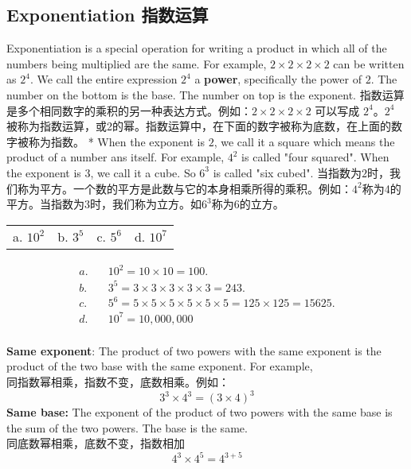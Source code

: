 \subsection{Exponentiation 指数运算}
\begin{paracol}{2}
Exponentiation is a special operation for writing a product in which all of the numbers being multiplied are the same. For example, $2\times 2\times 2\times 2$ can be written as $2^4$. We call the entire expression $2^4$ a {\bf power}, specifically the power of $2$. The number on the bottom is the base. The number on top is the exponent. 
\switchcolumn[1]
指数运算是多个相同数字的乘积的另一种表达方式。例如：$2\times 2\times 2\times 2$ 可以写成 $2^4$。$2^4$ 被称为指数运算，或2的幂。指数运算中，在下面的数字被称为底数，在上面的数字被称为指数。
\switchcolumn[0]*
When the exponent is $2$, we call it a square which means the product of a number ans itself. For example, $4^2$ is called "four squared". When the exponent is $3$, we call it a cube. So $6^3$ is called "six cubed".
\switchcolumn[1]
当指数为$2$时，我们称为平方。一个数的平方是此数与它的本身相乘所得的乘积。例如：$4^2$称为4的平方。当指数为$3$时，我们称为立方。如$6^3$称为6的立方。
\end{paracol}

\begin{example}
\begin{tabular}{cccc}
a. $10^2$& b. $3^5$ & c. $5^6$ & d. $10^7$
\end{tabular}
\end{example}
\begin{solution}
\begin{align*}
a.\quad & 10^2 = 10\times 10 = 100.\\
b.\quad & 3^5 = 3\times 3\times 3\times 3\times 3 = 243.\\
c.\quad & 5^6 = 5\times 5\times 5\times 5\times 5\times 5 = 125\times 125 = 15625.\\
d.\quad & 10^7 = 10,000,000\\
\end{align*}
\end{solution}

\begin{newprop}
{\bf Same exponent}: The product of two powers with the same exponent is the product of the two base with the same exponent. For example, \\
同指数幂相乘，指数不变，底数相乘。例如：
$$
3^3\times 4^3 = (3\times 4)^3
$$
{\bf Same base:} The exponent of the product of two powers with the same base is the sum of the two powers. The base is the same.\\
同底数幂相乘，底数不变，指数相加
$$
4^3\times 4^5 = 4^{3+5}
$$
\end{newprop}

